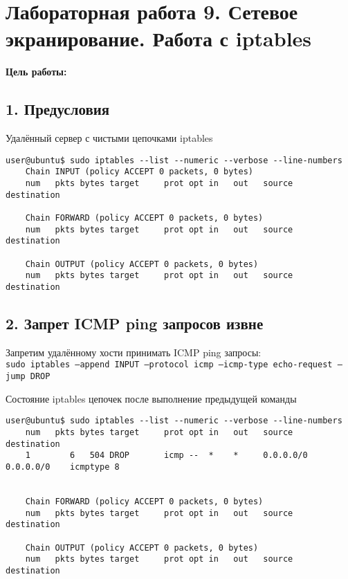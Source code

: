 \chapter*{Лабораторная работа 9. Сетевое экранирование. Работа с iptables}

\textbf{Цель работы:} 

\section*{1. Предусловия}

Удалённый сервер с чистыми цепочками iptables
\begin{Verbatim}[frame=single]
    user@ubuntu$ sudo iptables --list --numeric --verbose --line-numbers
    Chain INPUT (policy ACCEPT 0 packets, 0 bytes)
    num   pkts bytes target     prot opt in   out   source    destination

    Chain FORWARD (policy ACCEPT 0 packets, 0 bytes)
    num   pkts bytes target     prot opt in   out   source    destination

    Chain OUTPUT (policy ACCEPT 0 packets, 0 bytes)
    num   pkts bytes target     prot opt in   out   source    destination
\end{Verbatim}


\section*{2. Запрет ICMP ping запросов извне}

Запретим удалённому хости принимать ICMP ping запросы:\\
\texttt{sudo iptables --append INPUT --protocol icmp --icmp-type echo-request --jump DROP}

Состояние iptables цепочек после выполнение предыдущей команды
\begin{Verbatim}[frame=single]
    user@ubuntu$ sudo iptables --list --numeric --verbose --line-numbers
    num   pkts bytes target     prot opt in   out   source    destination
    1        6   504 DROP       icmp --  *    *     0.0.0.0/0 0.0.0.0/0    icmptype 8
    

    Chain FORWARD (policy ACCEPT 0 packets, 0 bytes)
    num   pkts bytes target     prot opt in   out   source    destination

    Chain OUTPUT (policy ACCEPT 0 packets, 0 bytes)
    num   pkts bytes target     prot opt in   out   source    destination
\end{Verbatim}

